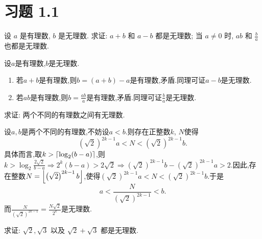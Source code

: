 \section*{习题 1.1}

\begin{exercise}[1.1.1]
    设 $a$ 是有理数, $b$ 是无理数. 求证: $a+b$ 和 $a-b$ 都是无理数; 当 $a \ne 0$ 时, $ab$ 和 $\frac{b}{a}$ 也都是无理数.
\end{exercise}

\begin{solution}
    设$a$是有理数,$b$是无理数.
    \begin{enumerate}[(1)]
        \item 若$a+b$是有理数,则$b = (a+b)-a$是有理数,矛盾.同理可证$a-b$是无理数.
        \item 若$ab$是有理数,则$b = \frac{ab}{a}$是有理数,矛盾.同理可证$\frac{b}{a}$是无理数.
    \end{enumerate}
\end{solution}

\begin{exercise}[1.1.2]
    求证: 两个不同的有理数之间有无理数.
\end{exercise}

\begin{solution}
    设$a,b$是两个不同的有理数,不妨设$a < b$.则存在正整数$k$, $N$使得
    $$\left( \sqrt{2} \right)^{2k-1} a < N < \left( \sqrt{2} \right)^{2k-1} b.$$
    具体而言,取$k > \llceil \log_2 (b-a) \rrceil$,则$k > \log_2 \frac{2 \sqrt{2}}{b-a} \Rightarrow 2^k(b-a) > 2 \sqrt{2} \Rightarrow \left( \sqrt{2} \right)^{2k-1} b - \left( \sqrt{2} \right)^{2k-1} a > 2$.因此,存在整数$N = \llfloor \left( \sqrt{2} \right)^{2k-1} b \rrfloor$,使得$\left( \sqrt{2} \right)^{2k-1} a < N < \left( \sqrt{2} \right)^{2k-1} b$.于是
    $$a < \frac{N}{\left( \sqrt{2} \right)^{2k-1}} < b.$$
    而$\frac{N}{\left( \sqrt{2} \right)^{2k-1}} = \frac{N \sqrt{2}}{2^k}$是无理数.
\end{solution}

\begin{exercise}[1.1.3]
    求证: $\sqrt{2}, \sqrt{3}$ 以及 $\sqrt{2}+\sqrt{3}$ 都是无理数.
\end{exercise}

